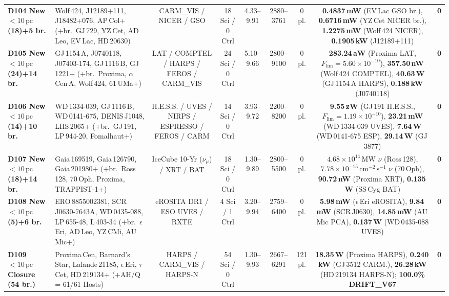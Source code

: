\documentclass[twocolumn,10pt]{article}
\begin{document}
\begin{table}[p]
{\begin{tabular}{llccccccc}
\textbf{D104 New $<10\,\text{pc}$ (18)+5 br.} & Wolf\,424, J12189+111, J18482+076, AP\,Col+ (+br.\ GJ\,729, YZ\,Cet, AD\,Leo, EV\,Lac, HD\,20630) & CARM\_VIS / NICER / GSO & 18 Sci / 0 Ctrl & 4.33--9.91 & 2880--3761 & 0 pl. & \textbf{0.4837\,mW} (EV\,Lac GSO br.), \textbf{0.6716\,mW} (YZ\,Cet NICER br.), \textbf{1.2275\,mW} (Wolf\,424 NICER), \textbf{0.1905\,kW} (J12189+111) & \textbf{0} \\
\textbf{D105 New $<10\,\text{pc}$ (24)+14 br.} & GJ\,1154\,A, J0740118, J07403-174, GJ\,1116\,B, GJ\,1221+ (+br.\ Proxima, $\alpha$\,Cen\,A, Wolf\,424, 61\,UMa+) & LAT / COMPTEL / HARPS / FEROS / CARM\_VIS & 24 Sci / 0 Ctrl & 5.10--9.66 & 2800--9100 & 0 pl. & \textbf{283.24\,aW} (Proxima LAT, $F_{\mathrm{lim}}=5.60\times 10^{-10}$), \textbf{357.50\,nW} (Wolf\,424 COMPTEL), \textbf{40.63\,W} (GJ\,1154\,A HARPS), \textbf{0.188\,kW} (J0740118) & \textbf{0} \\
\textbf{D106 New $<10\,\text{pc}$ (14)+10 br.} & WD\,1334-039, GJ\,1116\,B, WD\,0141-675, DENIS\,J1048, LHS\,2065+ (+br.\ GJ\,191, LP\,944-20, Fomalhaut+) & H.E.S.S. / UVES / NIRPS / ESPRESSO / FEROS / CARM & 14 Sci / 0 Ctrl & 3.93--9.72 & 2200--8200 & 0 pl. & \textbf{9.55\,zW} (GJ\,191 H.E.S.S., $F_{\mathrm{lim}}=1.19\times 10^{-10}$), \textbf{23.21\,mW} (WD\,1334-039 UVES), \textbf{7.64\,W} (WD\,0141-675 ESP), \textbf{29.14\,W} (GJ\,3877) & \textbf{0} \\
\textbf{D107 New $<10\,\text{pc}$ (18)+14 br.} & Gaia\,169519, Gaia\,126790, Gaia\,201980+ (+br.\ Ross\,128, 70\,Oph, Proxima, TRAPPIST-1+) & IceCube 10-Yr ($\nu_\mu$) / XRT / BAT & 18 Sci / 0 Ctrl & 1.30--9.89 & 2800--5500 & 0 pl. & \textbf{$4.68\times 10^{14}\,\mathrm{MW}$} $\nu$ (Ross\,128), \textbf{$7.78\times 10^{-15}\,\mathrm{cm^{-2}\,s^{-1}}$} $\nu$ (70\,Oph), \textbf{90.72\,nW} (Proxima XRT), \textbf{0.135\,W} (SS\,Cyg BAT) & \textbf{0} \\
\textbf{D108 New $<10\,\text{pc}$ (5)+6 br.} & ERO\,8855002381, SCR\,J0630-7643A, WD\,0435-088, LP\,655-48, L\,403-34 (+br.\ $\epsilon$\,Eri, AD\,Leo, YZ\,CMi, AU\,Mic+) & eROSITA DR1 / ESO UVES / RXTE & 4 Sci / 1 Ctrl & 3.20--9.94 & 2759--6400 & 0 pl. & \textbf{5.98\,mW} ($\epsilon$\,Eri eROSITA), \textbf{9.84\,mW} (SCR\,J0630), \textbf{14.85\,mW} (AU\,Mic PCA), \textbf{0.137\,W} (WD\,0435-088 UVES) & \textbf{0} \\
\textbf{D109 $<10\,\text{pc}$ Closure (54 br.)} & Proxima\,Cen, Barnard's\,Star, Lalande\,21185, $\epsilon$\,Eri, $\tau$\,Cet, HD\,219134+ (+AH/Q = 61/61 Hosts) & HARPS / CARM\_VIS / HARPS-N & 54 Sci / 0 Ctrl & 1.30--9.93 & 2667--6291 & 121 pl. & \textbf{18.35\,W} (Proxima HARPS), \textbf{0.240\,kW} (GJ\,3512 CARM.), \textbf{26.28\,kW} (HD\,219134 HARPS-N); \textbf{100.0\% DRIFT\_V67} & \textbf{0} \\

\end{tabular}}
\end{table}
\end{document}
